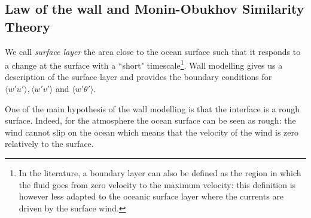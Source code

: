 \subsection{Law of the wall and Monin-Obukhov Similarity Theory}
\label{sec:airseaSCM_WallLaw}
We call \textit{surface layer} the area close to the ocean surface
such that it responds to a change at the surface with a ``short"
timescale\footnote{In the literature, a boundary layer can also
be defined as the region in which the fluid goes from zero
velocity to the maximum velocity: this definition is however
less adapted to the oceanic surface layer where the currents
are driven by the surface wind.}.
Wall modelling gives us a description of the surface layer
and provides the boundary conditions for
$\langle w' u'\rangle, \langle w' v'\rangle$ and
$\langle w' \theta'\rangle$.
\par
One of the main hypothesis of the wall modelling is that
the interface is a rough surface.
Indeed, for the atmosphere the ocean surface can be seen as
rough: the wind cannot slip on the ocean which
means that the velocity of the wind is zero relatively
to the surface.
%
